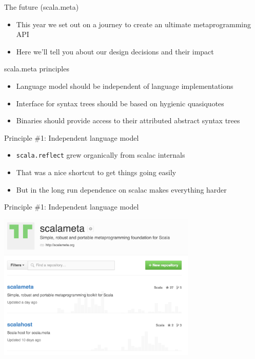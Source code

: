 \documentclass[svgnames,dvipsnames,hyperref={bookmarks=false},usepdftitle=false]{beamer}
\begin{document}
\begin{frame}{The future (scala.meta)}

\begin{itemize}
\item This year we set out on a journey to create an ultimate metaprogramming API
\item Here we'll tell you about our design decisions and their impact
\end{itemize}

\end{frame}

\begin{frame}{scala.meta principles}

\begin{itemize}
\item Language model should be independent of language implementations
\item Interface for syntax trees should be based on hygienic quasiquotes
\item Binaries should provide access to their attributed abstract syntax trees
\end{itemize}

\end{frame}

\begin{frame}{Principle \#1: Independent language model}

\begin{itemize}
\item \texttt{scala.reflect} grew organically from scalac internals
\item That was a nice shortcut to get things going easily
\item But in the long run dependence on scalac makes everything harder
\end{itemize}

\end{frame}

\begin{frame}[c, fragile]{Principle \#1: Independent language model}
\begin{center}
\includegraphics[height=7cm]{github.png}
\end{center}
\end{frame}
\end{document}
